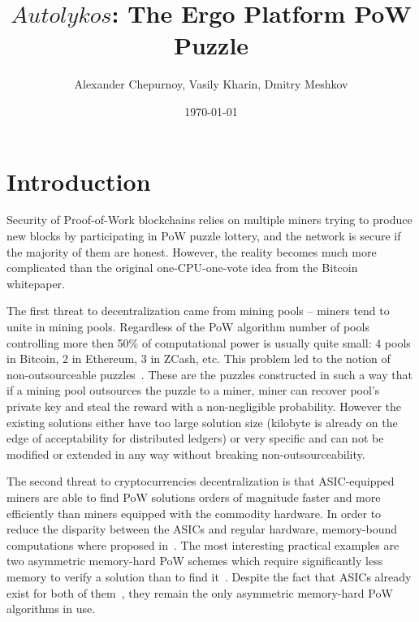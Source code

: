\documentclass[]{article}
\newcommand{\Name}{$Autolykos$}
\begin{document}
    \title{\Name: The Ergo Platform PoW Puzzle}

    \author{Alexander Chepurnoy, Vasily Kharin, Dmitry Meshkov}

    \date{\today}
    \maketitle



    \section{Introduction}

    Security of Proof-of-Work blockchains relies 
    on multiple miners trying to produce new blocks by
    participating in PoW puzzle lottery, and the network is secure if the
    majority of them are honest. However, the reality becomes much more complicated
    than the original one-CPU-one-vote idea from the Bitcoin whitepaper\cite{nakamoto2008bitcoin}.

    The first threat to decentralization came from mining pools -- miners tend
    to unite in mining pools.
    Regardless of the PoW algorithm number of pools controlling more then 50\% of
    computational power is usually quite small: 4 pools in Bitcoin, 2 in Ethereum, 3 in ZCash, etc.
    This problem led to the notion of non-outsourceable puzzles~\cite{miller2015nonoutsourceable,daian2017piecework}.
    These are the puzzles constructed in such a way that if a mining pool outsources the puzzle
    to a miner, miner can recover pool's private key and steal the reward with a non-negligible probability.
    However the existing solutions either have too large solution size (kilobyte is already
    on the edge of acceptability for distributed ledgers) or very specific and
    can not be modified or extended in any way without breaking non-outsourceability.

    The second threat to cryptocurrencies decentralization is that ASIC-equipped miners are
    able to find PoW solutions orders of magnitude faster and more efficiently
    than miners equipped with the commodity hardware. In order to reduce the
    disparity between the ASICs and regular hardware, memory-bound computations
    where proposed in~\cite{dwork2003memory}. The most interesting practical
    examples are two
    asymmetric memory-hard PoW schemes which require significantly less memory
    to verify a solution than to find it~\cite{biryukov2017equihash,ethHash}.
    Despite the fact that ASICs already exist for both of them~\cite{ETHAsics,EquihashAsics},
    they remain the only asymmetric memory-hard PoW algorithms in use.
\end{document}
